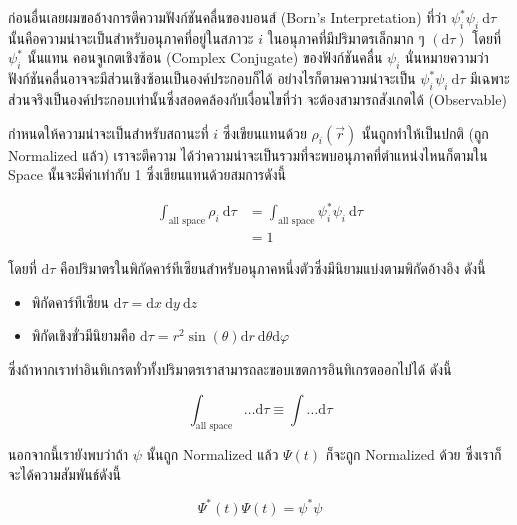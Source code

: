 ก่อนอื่นเลยผมขออ้างการตีความฟังก์ชันคลื่นของบอนส์ (Born's Interpretation) ที่ว่า $\psi_i^* \psi_i \mathrm{~d} \tau$
นั้นคือความน่าจะเป็นสำหรับอนุภาคที่อยู่ในสภาวะ $i$ ในอนุภาคที่มีปริมาตรเล็กมาก ๆ $(\mathrm{d} \tau)$ โดยที่ $\psi_i^*$ นั้นแทน%
คอนจูเกตเชิงซ้อน (Complex Conjugate) ของฟังก์ชันคลื่น $\psi_i$ นั่นหมายความว่าฟังก์ชันคลื่นอาจจะมีส่วนเชิงซ้อนเป็นองค์ประกอบก็ได้
อย่างไรก็ตามความน่าจะเป็น $\psi_i^* \psi_i \mathrm{~d} \tau$ มีเฉพาะส่วนจริงเป็นองค์ประกอบเท่านั้นซึ่งสอดคล้องกับเงื่อนไขที่ว่า%
จะต้องสามารถสังเกตได้ (Observable)

กำหนดให้ความน่าจะเป็นสำหรับสถานะที่ $i$ ซึ่งเขียนแทนด้วย $\rho_i(\vec{r})$ นั้นถูกทำให้เป็นปกติ (ถูก Normalized แล้ว) เราจะตีความ%
ได้ว่าความน่าจะเป็นรวมที่จะพบอนุภาคที่ตำแหน่งไหนก็ตามใน Space นั้นจะมีค่าเท่ากับ 1 ซึ่งเขียนแทนด้วยสมการดังนี้

\begin{equation}
    \begin{aligned}
        \int_{\text{all space}} \rho_i \mathrm{~d} \tau
         & = \int_{\text{all space}} \psi_i^* \psi_i \mathrm{~d} \tau \\
         & = 1
    \end{aligned}
\end{equation}

\noindent โดยที่ $\mathrm{d} \tau$ คือปริมาตรในพิกัดคาร์ทีเซียนสำหรับอนุภาคหนึ่งตัวซึ่งมีนิยามแบ่งตามพิกัดอ้างอิง ดังนี้

\begin{itemize}
    \item พิกัดคาร์ทีเซียน $\mathrm{d} \tau = \mathrm{d} x \mathrm{~d} y \mathrm{~d} z$

    \item พิกัดเชิงขั่วมีนิยามคือ $\mathrm{d} \tau = r^2 \sin (\theta) \mathrm{d} r \mathrm{~d} \theta \mathrm{d} \varphi$
\end{itemize}

\noindent ซึ่งถ้าหากเราทำอินทิเกรตทั่วทั้งปริมาตรเราสามารถละขอบเขตการอินทิเกรตออกไปได้ ดังนี้

\begin{equation}
    \int_{\text{all space}} \ldots \mathrm{d} \tau \equiv \int \ldots \mathrm{d} \tau
\end{equation}

นอกจากนี้เรายังพบว่าถ้า $\psi$ นั้นถูก Normalized แล้ว $\Psi(t)$ ก็จะถูก Normalized ด้วย ซึ่งเราก็จะได้ความสัมพันธ์ดังนี้

\begin{equation}
    \Psi^*(t) \Psi(t) = \psi^* \psi
\end{equation}

